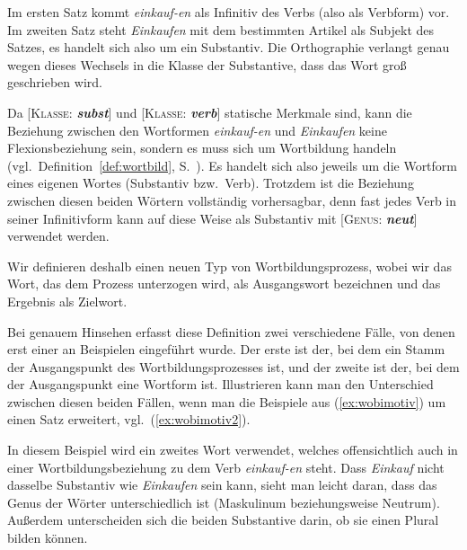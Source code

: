 Im ersten Satz kommt \textit{einkauf-en} als Infinitiv des Verbs (also als Verbform) vor.
Im zweiten Satz steht \textit{Einkaufen} mit dem bestimmten Artikel als Subjekt des Satzes, es handelt sich also um ein Substantiv.
Die Orthographie verlangt genau wegen dieses Wechsels in die Klasse der Substantive, dass das Wort groß geschrieben wird.

Da [\textsc{Klasse}: \textit{\textbf{subst}}] und [\textsc{Klasse}: \textit{\textbf{verb}}] statische Merkmale sind, kann die Beziehung zwischen den Wortformen \textit{einkauf-en} und \textit{Einkaufen} keine Flexionsbeziehung sein, sondern es muss sich um Wortbildung handeln (vgl.\ Definition~\ref{def:wortbild}, S.~\pageref{def:wortbild}).
Es handelt sich also jeweils um die Wortform eines eigenen Wortes (Substantiv bzw.\ Verb).
Trotzdem ist die Beziehung zwischen diesen beiden Wörtern vollständig vorhersagbar, denn fast jedes Verb in seiner Infinitivform kann auf diese Weise als Substantiv mit [\textsc{Genus}: \textit{\textbf{neut}}] verwendet werden.

Wir definieren deshalb einen neuen Typ von Wortbildungsprozess, wobei wir das Wort, das dem Prozess unterzogen wird, als Ausgangswort bezeichnen und das Ergebnis als Zielwort.


Bei genauem Hinsehen erfasst diese Definition zwei verschiedene Fälle, von denen erst einer an Beispielen eingeführt wurde.
Der erste ist der, bei dem ein Stamm der Ausgangspunkt des Wortbildungsprozesses ist, und der zweite ist der, bei dem der Ausgangspunkt eine Wortform ist.
Illustrieren kann man den Unterschied zwischen diesen beiden Fällen, wenn man die Beispiele aus (\ref{ex:wobimotiv}) um einen Satz erweitert, vgl.\ (\ref{ex:wobimotiv2}).

\begin{exe}
\end{exe}

In diesem Beispiel wird ein zweites Wort verwendet, welches offensichtlich auch in einer Wortbildungsbeziehung zu dem Verb \textit{einkauf-en} steht.
Dass \textit{Einkauf} nicht dasselbe Substantiv wie \textit{Einkaufen} sein kann, sieht man leicht daran, dass das Genus der Wörter unterschiedlich ist (Maskulinum beziehungsweise Neutrum).
Außerdem unterscheiden sich die beiden Substantive darin, ob sie einen Plural bilden können.

